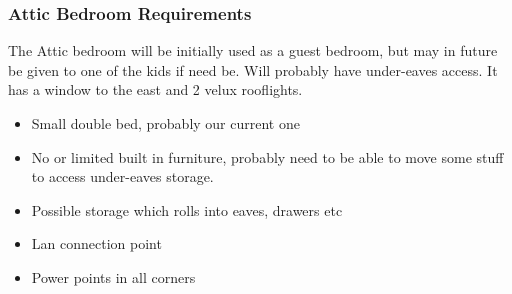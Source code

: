 \subsubsection{Attic Bedroom Requirements}
The Attic bedroom will be initially used as a guest bedroom, but may in future be given to one of the kids if need be. Will probably have under-eaves access.
It has a window to the east and 2 velux rooflights.

\begin{itemize}
\item Small double bed, probably our current one 
\item No or limited built in furniture, probably need to be able to move some stuff to access under-eaves storage.
\item Possible storage which rolls into eaves, drawers etc
\item Lan connection point
\item Power points in all corners
\end{itemize}

